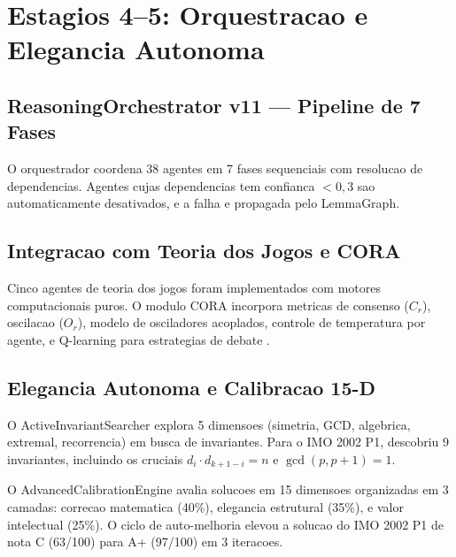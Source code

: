 \documentclass[5p]{elsarticle}
\begin{document}
\section{Estagios 4--5: Orquestracao e Elegancia Autonoma}

\subsection{ReasoningOrchestrator v11 — Pipeline de 7 Fases}

O orquestrador coordena 38 agentes em 7 fases sequenciais com resolucao de
dependencias. Agentes cujas dependencias tem confianca $<0,3$ sao automaticamente
desativados, e a falha e propagada pelo LemmaGraph.

\subsection{Integracao com Teoria dos Jogos e CORA}

Cinco agentes de teoria dos jogos \cite{nash1950,vonneumann1944,shapley1953,smith1973}
foram implementados com motores computacionais puros. O modulo CORA \cite{macedo2025}
incorpora metricas de consenso ($C_r$), oscilacao ($O_r$), modelo de osciladores
acoplados, controle de temperatura por agente, e Q-learning para estrategias
de debate \cite{bellman1954,sutton1998}.

\subsection{Elegancia Autonoma e Calibracao 15-D}

O ActiveInvariantSearcher explora 5 dimensoes (simetria, GCD, algebrica,
extremal, recorrencia) em busca de invariantes. Para o IMO 2002 P1, descobriu
9 invariantes, incluindo os cruciais $d_i\cdot d_{k+1-i}=n$ e $\gcd(p,p+1)=1$.

O AdvancedCalibrationEngine avalia solucoes em 15 dimensoes organizadas em
3 camadas: correcao matematica (40\%), elegancia estrutural (35\%), e valor
intelectual (25\%). O ciclo de auto-melhoria elevou a solucao do IMO 2002 P1
de nota C (63/100) para A+ (97/100) em 3 iteracoes.
\end{document}
